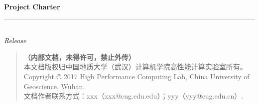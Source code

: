 \thispagestyle{empty}

\noindent\begin{minipage}{\textwidth}
\raggedleft
{\huge \bfseries Project Charter}
\noindent\rule[-1ex]{\textwidth}{5pt}\\[2.5ex]
\hfill\emph{\Large Release}
\end{minipage}

\noindent{}


\begin{quote}\footnotesize
   \textbf{（内部文档，未得许可，禁止外传）}\\
    本文档版权归中国地质大学（武汉）计算机学院高性能计算实验室所有。\\
    Copyright \copyright{}  2017  High Performance Computing Lab, China University of Geoscience, Wuhan. \\
    文档作者联系方式：xxx（xxx@cug.edu.edu）；yyy（yyy@cug.edu.cn）.
\end{quote}